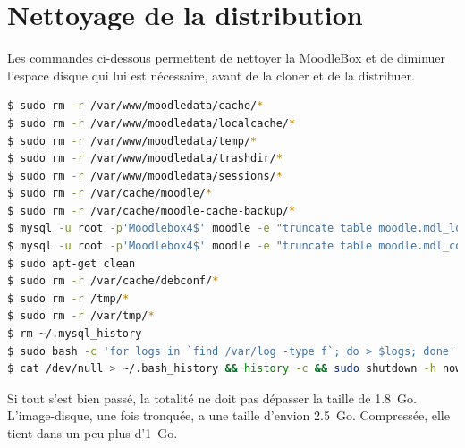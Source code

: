 \documentclass[11pt]{article}
\begin{document}
\section{Nettoyage de la distribution}

Les commandes ci-dessous permettent de nettoyer la MoodleBox et de diminuer l'espace disque qui lui est nécessaire, avant de la cloner et de la distribuer.

\begin{lstlisting}[language=bash]
$ sudo rm -r /var/www/moodledata/cache/*
$ sudo rm -r /var/www/moodledata/localcache/*
$ sudo rm -r /var/www/moodledata/temp/*
$ sudo rm -r /var/www/moodledata/trashdir/*
$ sudo rm -r /var/www/moodledata/sessions/*
$ sudo rm -r /var/cache/moodle/*
$ sudo rm -r /var/cache/moodle-cache-backup/*
$ mysql -u root -p'Moodlebox4$' moodle -e "truncate table moodle.mdl_logstore_standard_log"
$ mysql -u root -p'Moodlebox4$' moodle -e "truncate table moodle.mdl_config_log"
$ sudo apt-get clean
$ sudo rm -r /var/cache/debconf/*
$ sudo rm -r /tmp/*
$ sudo rm -r /var/tmp/*
$ rm ~/.mysql_history
$ sudo bash -c 'for logs in `find /var/log -type f`; do > $logs; done'
$ cat /dev/null > ~/.bash_history && history -c && sudo shutdown -h now
\end{lstlisting}

Si tout s'est bien passé, la totalité ne doit pas dépasser la taille de 1.8~Go. L'image-disque, une fois tronquée, a une taille d'envion 2.5~Go. Compressée, elle tient dans un peu plus d'1~Go.
\end{document}
